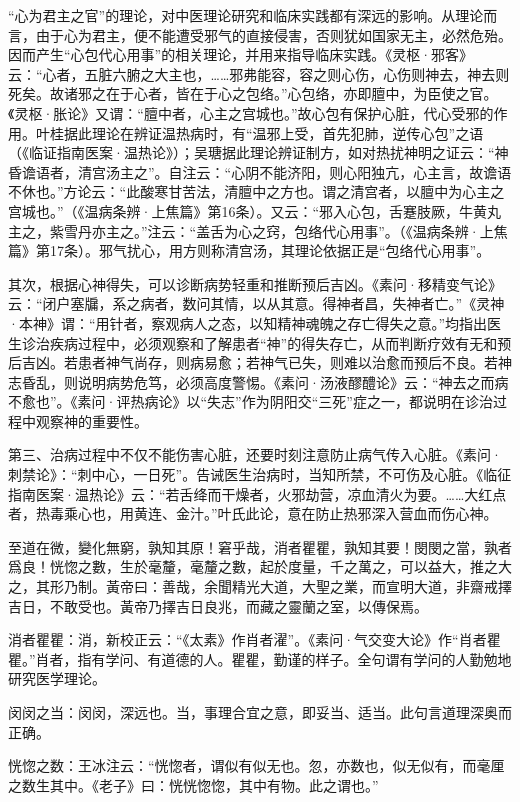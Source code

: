 \documentclass[12pt]{ctexbook}
\begin{document}
“心为君主之官”的理论，对中医理论研究和临床实践都有深远的影响。从理论而言，由于心为君主，便不能遭受邪气的直接侵害，否则犹如国家无主，必然危殆。因而产生“心包代心用事”的相关理论，并用来指导临床实践。《灵枢·邪客》云：“心者，五脏六腑之大主也，……邪弗能容，容之则心伤，心伤则神去，神去则死矣。故诸邪之在于心者，皆在于心之包络。”心包络，亦即膻中，为臣使之官。《灵枢·胀论》又谓：“膻中者，心主之宫城也。”故心包有保护心脏，代心受邪的作用。叶桂据此理论在辨证温热病时，有“温邪上受，首先犯肺，逆传心包”之语（《临证指南医案·温热论》）；吴瑭据此理论辨证制方，如对热扰神明之证云：“神昏谵语者，清宫汤主之”。自注云：“心阴不能济阳，则心阳独亢，心主言，故谵语不休也。”方论云：“此酸寒甘苦法，清膻中之方也。谓之清宫者，以膻中为心主之宫城也。”（《温病条辨·上焦篇》第16条）。又云：“邪入心包，舌蹇肢厥，牛黄丸主之，紫雪丹亦主之。”注云：“盖舌为心之窍，包络代心用事”。（《温病条辨·上焦篇》第17条）。邪气扰心，用方则称清宫汤，其理论依据正是“包络代心用事”。

其次，根据心神得失，可以诊断病势轻重和推断预后吉凶。《素问·移精变气论》云：“闭户塞牖，系之病者，数问其情，以从其意。得神者昌，失神者亡。”《灵神·本神》谓：“用针者，察观病人之态，以知精神魂魄之存亡得失之意。”均指出医生诊治疾病过程中，必须观察和了解患者“神”的得失存亡，从而判断疗效有无和预后吉凶。若患者神气尚存，则病易愈；若神气已失，则难以治愈而预后不良。若神志昏乱，则说明病势危笃，必须高度警惕。《素问·汤液醪醴论》云：“神去之而病不愈也”。《素问·评热病论》以“失志”作为阴阳交“三死”症之一，都说明在诊治过程中观察神的重要性。

第三、治病过程中不仅不能伤害心脏，还要时刻注意防止病气传入心脏。《素问·刺禁论》：“刺中心，一日死”。告诫医生治病时，当知所禁，不可伤及心脏。《临征指南医案·温热论》云：“若舌绛而干燥者，火邪劫营，凉血清火为要。……大红点者，热毒乘心也，用黄连、金汁。”叶氏此论，意在防止热邪深入营血而伤心神。


\begin{yuanwen}
至道在微，變化無窮，孰知其原！窘乎哉，消者瞿瞿，孰知其要！閔閔之當，孰者爲良！恍惚之數，生於毫釐，毫釐之數，起於度量，千之萬之，可以益大，推之大之，其形乃制。黃帝曰：善哉，余聞精光大道，大聖之業，而宣明大道，非齋戒擇吉日，不敢受也。黃帝乃擇吉日良兆，而藏之靈蘭之室，以傳保焉。
\end{yuanwen}


\begin{jiaozhu}
	\item 消者瞿瞿：消，新校正云：“《太素》作肖者濯”。《素问·气交变大论》作“肖者瞿瞿。”肖者，指有学问、有道德的人。瞿瞿，勤谨的样子。全句谓有学问的人勤勉地研究医学理论。
	\item 闵闵之当：闵闵，深远也。当，事理合宜之意，即妥当、适当。此句言道理深奥而正确。
	\item 恍惚之数：王冰注云：“恍惚者，谓似有似无也。忽，亦数也，似无似有，而毫厘之数生其中。《老子》曰：恍恍惚惚，其中有物。此之谓也。”
\end{jiaozhu}
\end{document}
